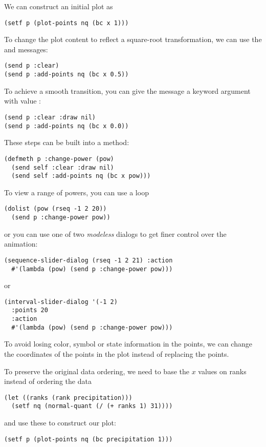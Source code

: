 \begin{slide}{}
We can construct an initial plot as
{\Large
\begin{verbatim}
(setf p (plot-points nq (bc x 1)))
\end{verbatim}}
To change the plot content to reflect a square-root transformation, we
can use the  and  messages:
{\Large
\begin{verbatim}
(send p :clear)
(send p :add-points nq (bc x 0.5))
\end{verbatim}}
To achieve a smooth transition, you can give the  message
a keyword argument  with value :
{\Large
\begin{verbatim}
(send p :clear :draw nil)
(send p :add-points nq (bc x 0.0))
\end{verbatim}}
These steps can be built into a  method:
{\Large
\begin{verbatim}
(defmeth p :change-power (pow)
  (send self :clear :draw nil)
  (send self :add-points nq (bc x pow)))
\end{verbatim}}
\end{slide}

\begin{slide}{}
To view a range of powers, you can use a  loop
{\Large
\begin{verbatim}
(dolist (pow (rseq -1 2 20))
  (send p :change-power pow))
\end{verbatim}}
or you can use one of two {\em modeless}\/ dialogs to get finer control
over the animation:
{\Large
\begin{verbatim}
(sequence-slider-dialog (rseq -1 2 21) :action
  #'(lambda (pow) (send p :change-power pow)))
\end{verbatim}}
or
{\Large
\begin{verbatim}
(interval-slider-dialog '(-1 2)
  :points 20
  :action
  #'(lambda (pow) (send p :change-power pow)))
\end{verbatim}}
\end{slide}

\begin{slide}{}
To avoid losing color, symbol or state information in the points, we
can change the coordinates of the points in the plot instead of
replacing the points.

To preserve the original data ordering, we need to base the $x$ values
on ranks instead of ordering the data
{\Large
\begin{verbatim}
(let ((ranks (rank precipitation)))
  (setf nq (normal-quant (/ (+ ranks 1) 31))))
\end{verbatim}}
and use these to construct our plot:
{\Large
\begin{verbatim}
(setf p (plot-points nq (bc precipitation 1)))
\end{verbatim}}
\end{slide}

